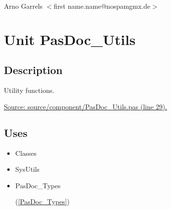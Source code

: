 \documentclass{report}
\begin{document}
\par
Arno Garrels {$<$}first name.name@nospamgmx.de{$>$}

\chapter{Unit PasDoc{\_}Utils}
\label{PasDoc_Utils}
\section{Description}
Utility functions.\hfill\vspace*{1ex}

   \par
\href{https://github.com/pasdoc/pasdoc/blob/master/source/component/PasDoc_Utils.pas#L29}{Source: source/component/PasDoc{\_}Utils.pas (line 29).}
\section{Uses}
\begin{itemize}
\item \begin{ttfamily}Classes\end{ttfamily}\item \begin{ttfamily}SysUtils\end{ttfamily}\item \begin{ttfamily}PasDoc{\_}Types\end{ttfamily}(\ref{PasDoc_Types})\end{itemize}
\end{document}
